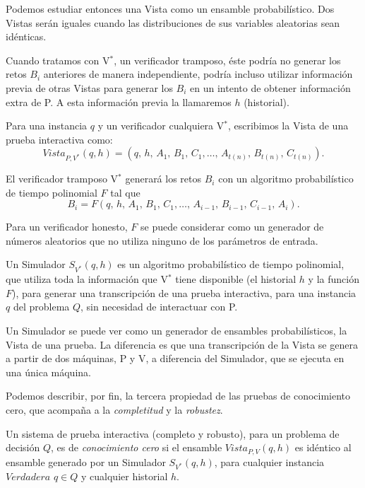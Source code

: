 Podemos estudiar entonces una Vista como un ensamble probabilístico. Dos Vistas serán iguales cuando las distribuciones de sus variables aleatorias sean idénticas.


\hfil

Cuando tratamos con V$^*$, un verificador tramposo, éste podría no generar los retos $B_i$ anteriores de manera independiente, podría incluso utilizar información previa de otras Vistas para generar los $B_i$ en un intento de obtener información extra de P. A esta información previa la llamaremos $h$ (historial).

Para una instancia $q$ y un verificador cualquiera V$^*$, escribimos la Vista de una prueba interactiva como:
\[ Vista_{P,V^*}(q,h) = (q,\,h,\,A_1,\,B_1,\,C_1, \dots ,\,A_{t(n)},\,B_{t(n)},\,C_{t(n)}). \]

El verificador tramposo V$^*$ generará los retos $B_i$ con un algoritmo probabilístico de tiempo polinomial $F$ tal que
\[ B_i = F(q,\,h,\,A_1,\,B_1,\,C_1, \dots ,\,A_{i-1},\,B_{i-1},\,C_{i-1},\,A_i). \]

Para un verificador honesto, $F$ se puede considerar como un generador de números aleatorios que no utiliza ninguno de los parámetros de entrada.



\begin{definition}
	Un Simulador $S_{V^*}(q,h)$ es un algoritmo probabilístico de tiempo polinomial, que utiliza toda la información que V$^*$ tiene disponible (el historial $h$ y la función $F$), para generar una transcripción de una prueba interactiva, para una instancia $q$ del problema $Q$, sin necesidad de interactuar con P.
\end{definition}

Un Simulador se puede ver como un generador de ensambles probabilísticos, la Vista de una prueba. La diferencia es que una transcripción de la Vista se genera a partir de dos máquinas, P y V, a diferencia del Simulador, que se ejecuta en una única máquina.


\hfil

Podemos describir, por fin, la tercera propiedad de las pruebas de conocimiento cero, que acompaña a la \textit{completitud} y la \textit{robustez}.



\begin{definition}	
	Un sistema de prueba interactiva (completo y robusto), para un problema de decisión $Q$, es de \textit{conocimiento cero} si el ensamble $Vista_{P,V}(q,h)$ es idéntico al ensamble generado por un Simulador $S_{V^*}(q,h)$, para cualquier instancia $Verdadera$ $q\in Q$ y cualquier historial $h$.
\end{definition}

